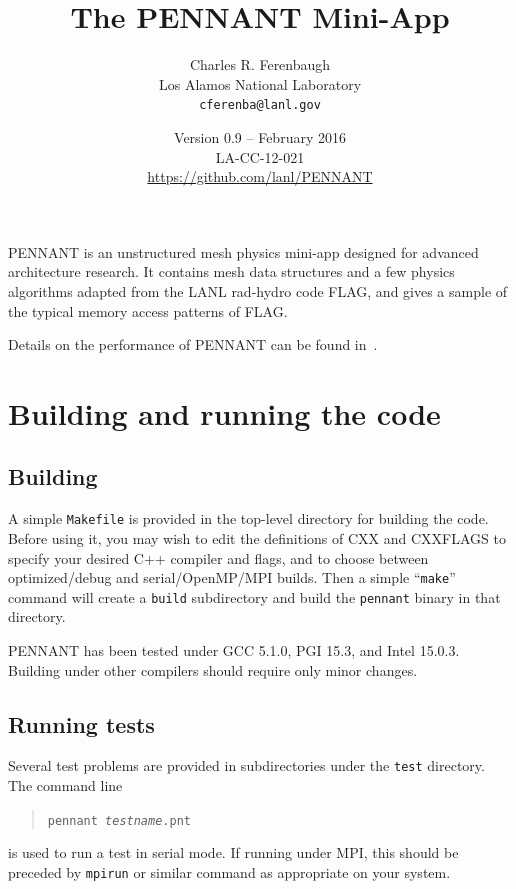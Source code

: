\documentclass[11pt,letterpaper]{article}
\begin{document}
\title{The PENNANT Mini-App}
\author{Charles R. Ferenbaugh \\
        Los Alamos National Laboratory \\
        {\tt cferenba@lanl.gov}}
\date{Version 0.9 -- February 2016 \\
      LA-CC-12-021 \\
      \url{https://github.com/lanl/PENNANT}}
\maketitle

PENNANT is an unstructured mesh physics mini-app designed for advanced
architecture research.
It contains mesh data structures and a few physics algorithms adapted
from the LANL rad-hydro code FLAG, and gives a
sample of the typical memory access patterns of FLAG.

Details on the performance of PENNANT can be found in~\cite{pnt1,pnt2}.


\section{Building and running the code}

\subsection{Building}

A simple {\tt Makefile} is provided in the top-level directory for building
the code.  Before using it, you may wish to edit the definitions of CXX
and CXXFLAGS to specify your desired C++ compiler and flags, and to
choose between optimized/debug and serial/OpenMP/MPI builds.  Then
a simple ``{\tt make}'' command will create a {\tt build} subdirectory and
build the {\tt pennant} binary in that directory.

PENNANT has been tested under GCC 5.1.0, PGI 15.3, and Intel 15.0.3.
Building under other compilers should require only minor changes.

\subsection{Running tests}

Several test problems are provided in subdirectories under the {\tt test}
directory.  The command line
\begin{quote}
{\tt pennant \emph{testname}.pnt}
\end{quote}
is used to run a test in serial mode.  If running under MPI, this should
be preceded by {\tt mpirun} or similar command as appropriate on your
system.
\end{document}
